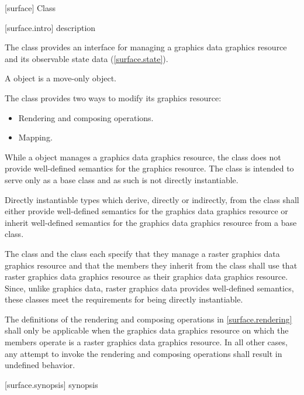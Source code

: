  [surface] {Class }

 [surface.intro] { description}

\pnum
{}
The  class provides an interface for managing a graphics
data graphics resource and its observable state data
(\ref{surface.state}).

\pnum
A  object is a move-only object.

\pnum
The  class provides two ways to modify its graphics resource:
\begin{itemize}
	\item Rendering and composing operations.
	\item Mapping.
\end{itemize}

\pnum
\enternote
While a  object manages a graphics data graphics resource, the  class does not provide well-defined semantics for the graphics resource. The  class is intended to serve only as a base class and as such is not directly instantiable.
\exitnote

\pnum
Directly instantiable types which derive, directly or indirectly, from the  class shall either provide well-defined semantics for the graphics data graphics resource or inherit well-defined semantics for the graphics data graphics resource from a base class.

\pnum
\enterexample
The  class and the  class each specify that they manage a raster graphics data graphics resource and that the members they inherit from the  class shall use that raster graphics data graphics resource as their graphics data graphics resource. Since, unlike graphics data, raster graphics data provides well-defined semantics, these classes meet the requirements for being directly instantiable.
\exitexample

\pnum
The definitions of the rendering and composing operations in \ref{surface.rendering} shall only be applicable when the graphics data graphics resource on which the  members operate is a raster graphics data graphics resource. In all other cases, any attempt to invoke the rendering and composing operations shall result in undefined behavior.

 [surface.synopsis] { synopsis}

